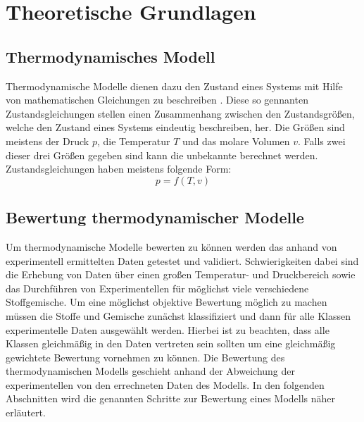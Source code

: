 \documentclass[../thesis.tex]{subfiles}
\begin{document}
	
\makeatletter %
\makeatother

\chapter{Theoretische Grundlagen}
\label{chp: grundlagen}

\section{Thermodynamisches Modell}

Thermodynamische Modelle dienen dazu den Zustand eines Systems mit Hilfe von mathematischen Gleichungen zu beschreiben \cite{atkins2006atkins}. Diese so gennanten Zustandsgleichungen stellen einen Zusammenhang zwischen den Zustandsgrößen, welche den Zustand eines Systems eindeutig beschreiben, her. Die Größen sind meistens der Druck $p$, die Temperatur $T$ und das molare Volumen $v$. Falls zwei dieser drei Größen gegeben sind kann die unbekannte berechnet werden. Zustandsgleichungen haben meistens folgende Form:
\begin{equation}
	p = f(T,v)
\end{equation}

\section{Bewertung thermodynamischer Modelle}

Um thermodynamische Modelle bewerten zu können werden das anhand von experimentell ermittelten Daten getestet und validiert. Schwierigkeiten dabei sind die Erhebung von Daten über einen großen Temperatur- und Druckbereich sowie das Durchführen von Experimentellen für möglichst viele verschiedene Stoffgemische. Um eine möglichst objektive Bewertung möglich zu machen müssen die Stoffe und Gemische zunächst klassifiziert und dann für alle Klassen experimentelle Daten ausgewählt werden. Hierbei ist zu beachten, dass alle Klassen gleichmäßig in den Daten vertreten sein sollten um eine gleichmäßig gewichtete Bewertung vornehmen zu können.
Die Bewertung des thermodynamischen Modells geschieht anhand der Abweichung der experimentellen von den errechneten Daten des Modells.
In den folgenden Abschnitten wird die genannten Schritte zur Bewertung eines Modells näher erläutert.
\end{document}

